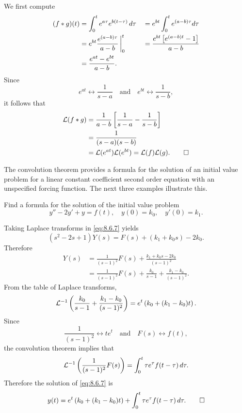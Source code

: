 \begin{solution}
We first compute
\begin{alignat*}{2}
(f\ast g)(t)
&=\displaystyle\int_0^t e^{a\tau}e^{b(t-\tau)}\,d\tau
&&=\displaystyle e^{bt}\int_0^t e^{(a-b)\tau} d\tau\\
&=e^{bt}\dfrac{e^{(a-b)\tau}}{a-b}\,\bigg|^t_0
&&=\dfrac{e^{bt}\left[e^{(a-b)t}-1\right]}{a-b}\\
&=\dfrac{e^{at}-e^{bt}}{a-b}.
\end{alignat*}
Since
\[
e^{at}\leftrightarrow \frac{1}{s-a}\quad\text{and}\quad
e^{bt}\leftrightarrow \frac{1}{s-b},
\]
it follows that
\begin{align*}
{\mathcal L}(f\ast g)
&=\frac{1}{a-b}\left[\frac{1}{s-a}-\frac{1}{s-b}\right]\\
&=\frac{1}{(s-a)(s-b)}\\
&={\mathcal L}(e^{at}){\mathcal L}(e^{bt})={\mathcal L}(f){\mathcal L}(g).\qedhere
\end{align*}
\end{solution}



The convolution theorem provides a formula for the
solution of an initial value problem for a linear constant coefficient
second order equation with an unspecified forcing function.
The next three examples illustrate this.

\begin{example}\label{example:8.6.2}
 Find a formula for the solution of the initial value problem
\begin{equation}\label{eq:8.6.7}
y''-2y'+y=f(t),\quad  y(0)=k_0,\quad y'(0)=k_1.
\end{equation}
\end{example}

\begin{solution}
Taking Laplace transforms in \eqref{eq:8.6.7} yields
\[
(s^2-2s+1)Y(s)=F(s)+(k_1+k_0s)-2k_0.
\]
Therefore
\begin{align*}
Y(s)&=\frac{1}{(s-1)^2}F(s)+\frac{k_1+k_0s-2k_0}{(s-1)^2}\\
&=\frac{1}{(s-1)^2}F(s)+\frac{k_0}{s-1}+\frac{k_1-k_0}{(s-1)^2}.
\end{align*}
From the table of Laplace transforms,
\[
{\mathcal L}^{-1}\left(\frac{k_0}{s-1}+\frac{k_1-k_0}{(s-1)^2}\right)
=e^t\left(k_0+(k_1-k_0)t\right).
\]
Since
\[
\frac{1}{(s-1)^2}\leftrightarrow te^t\quad\text{and}\quad F(s)
\leftrightarrow f(t),
\]
the convolution theorem implies that
\[
{\mathcal L}^{-1}
\left(\frac{1}{(s-1)^2}F(s)\right)=
\int_0^t\tau e^\tau f(t-\tau)\,d\tau.
\]
Therefore the solution of  \eqref{eq:8.6.7} is
\[
y(t)=e^t\left(k_0+(k_1-k_0)t\right)+\int_0^t\tau e^\tau f(t-\tau)\,
d\tau.\qedhere
\]
\end{solution}

